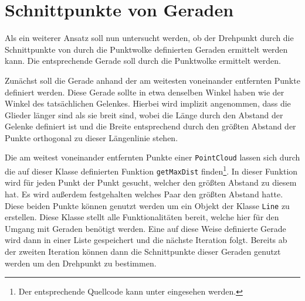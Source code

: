 


\section{Schnittpunkte von Geraden}\label{ch:schnittpunkt_gerade}

Als ein weiterer Ansatz soll nun untersucht werden, ob der Drehpunkt durch die Schnittpunkte von durch die Punktwolke definierten Geraden ermittelt werden kann.
Die entsprechende Gerade soll durch die Punktwolke ermittelt werden.

Zunächst soll die Gerade anhand der am weitesten voneinander entfernten Punkte definiert werden.
Diese Gerade sollte in etwa denselben Winkel haben wie der Winkel des tatsächlichen Gelenkes.
Hierbei wird implizit angenommen, dass die Glieder länger sind als sie breit sind, wobei die Länge durch den Abstand der Gelenke definiert ist und die Breite entsprechend durch den größten Abstand der Punkte orthogonal zu dieser Längenlinie stehen.

Die am weitest voneinander entfernten Punkte einer \lstinline{PointCloud} lassen sich durch die auf dieser Klasse definierten Funktion \lstinline{getMaxDist} finden\footnote{Der entsprechende Quellcode kann unter  eingesehen werden.}.
In dieser Funktion wird für jeden Punkt der Punkt gesucht, welcher den grö{\ss}ten Abstand zu diesem hat. Es wird au{\ss}erdem festgehalten welches Paar den grö{\ss}ten Abstand hatte.
Diese beiden Punkte können genutzt werden um ein Objekt der Klasse \lstinline{Line} zu erstellen.
Diese Klasse stellt alle Funktionalitäten bereit, welche hier für den Umgang mit Geraden benötigt werden.
Eine auf diese Weise definierte Gerade wird dann in einer Liste gespeichert und die nächste Iteration folgt.
Bereits ab der zweiten Iteration können dann die Schnittpunkte dieser Geraden genutzt werden um den Drehpunkt zu bestimmen.

